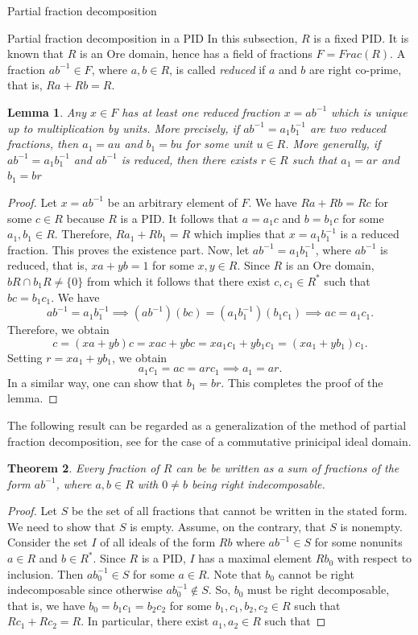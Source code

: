 \documentclass[11pt,a4paper]{article}
\theoremstyle{theorem}
\newtheorem{theorem}{Theorem}[section]
\newtheorem{lemma}[theorem]{Lemma}
\numberwithin{equation}{section}
\begin{document}
\begin{section}{Partial fraction decomposition}
\begin{subsection}{Partial fraction decomposition in a PID}
		In this subsection, $R$ is a fixed PID. It is known that $R$ is an Ore domain, hence has a field of fractions $F=Frac(R)$. A fraction $ab^{-1}\in F$, where $a,b\in R$, is called \textit{reduced} if $a$ and $b$ are right co-prime, that is, $Ra+Rb=R$. 
		\begin{lemma}
			Any $x\in F$ has at least  one reduced fraction $x=ab^{-1}$ which is unique up to multiplication by units. More precisely, if $ab^{-1}=a_1b_1^{-1}$ are two reduced fractions, then $a_1=au$ and $b_1=bu$ for some unit $u\in R$.  More generally, if $ab^{-1}=a_1b_1^{-1}$  and $ab^{-1}$ is reduced, then there exists $r\in R$ such that  $a_1=ar$ and $b_1=br$
		\end{lemma}
		\begin{proof}
			Let $x=ab^{-1}$ be an arbitrary element of $F$. We have $Ra+Rb=Rc$ for some $c\in R$ because $R$ is a PID. It follows that 
			$a=a_1c$ and $b=b_1c$ for some $a_1,b_1\in R$.
			Therefore, $Ra_1+Rb_1=R$ which implies that $x=a_1b_1^{-1}$ is a reduced fraction. This proves the existence part. 
			Now, let $ab^{-1}=a_1b_1^{-1}$, where $ab^{-1}$ is reduced, that is,
			$xa+yb=1$
			for some $x,y\in R$. Since $R$ is an Ore domain, $bR\cap b_1R\neq\{0\}$ from which it follows that there exist $c,c_1\in R^*$ such that $bc=b_1c_1$. We have
			$$ ab^{-1}=a_1b_1^{-1}\implies (ab^{-1})(bc)=(a_1b_1^{-1})(b_1c_1)\implies ac=a_1c_1.$$
			Therefore, we obtain
			$$c=(xa+yb)c=xac+ybc=xa_1c_1+yb_1c_1=(xa_1+yb_1)c_1.$$ Setting  $r=xa_1+yb_1$,  we obtain
			$$a_1c_1=ac=arc_1\implies a_1 = a r.$$
			In a similar way, one can show that $b_1=br$. This completes the proof of the lemma.   
		\end{proof}
		The following result can be regarded as a generalization of the method of partial fraction decomposition,  see \cite{lang2012algebra} for the case of a commutative prinicipal ideal domain.  
		\begin{theorem}\label{(T)Partialfractiondecomposition}
			Every fraction of $R$ can be be written as a sum of fractions of the form $ab^{-1}$, where $a,b\in R$  with $0\neq b$ being right indecomposable. 
		\end{theorem}
		\begin{proof}	
			Let $S$ be the set of all fractions that cannot be written in the stated form. We need to show that $S$ is empty.  Assume, on the contrary, that $S$ is nonempty. Consider the set $I$ of all ideals of the form $Rb$ where   $ab^{-1}\in S$ for some nonunits $a\in R$ and $b\in R^*$. Since $R$ is a PID, $I$ has a maximal element $Rb_0$ with respect to inclusion. Then $ab_0^{-1}\in S$ for some $a\in R$. Note that $b_0$ cannot be right indecomposable since otherwise $ab_0^{-1}\notin S$.   So, $b_0$ must be right decomposable, that is, we have $b_0=b_1c_1=b_2c_2$ for some $b_1,c_1,b_2,c_2\in R$ such that $Rc_1+Rc_2=R$. In particular, there exist $a_1,a_2\in R$ such that

\end{proof}
\end{subsection}
\end{section}
\end{document}
